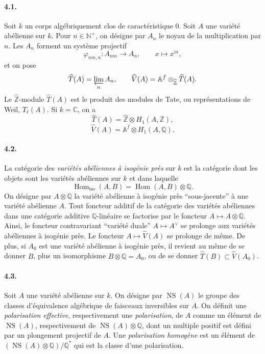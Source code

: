 \documentclass[10pt]{article}
\newcommand{\Af}{\mathbb A^f}
\newcommand{\C}{\mathbb C}
\newcommand{\Q}{\mathbb Q}
\newcommand{\Z}{\mathbb Z}
\newcommand{\Hom}{\operatorname{Hom}}
\newcommand{\NS}{\operatorname{NS}}
\begin{document}
\paragraph{4.1.} Soit $k$ un corps algébriquement clos de caractéristique $0$. Soit $A$ une variété abélienne sur $k$. Pour $n\in\mathbb N^+$, on désigne par $A_n$ le noyau de la multiplication par $n$. Les $A_n$ forment un système projectif
\[
\varphi_{nm,n}:A_{nm}\longrightarrow A_n,\qquad x\longmapsto x^m,
\]
et on pose
\[
\widehat T(A)=\varprojlim_n A_n,\qquad
\widehat V(A)=\Af\otimes_{\widehat{\Z}}\widehat T(A).
\]
Le $\widehat{\Z}$-module $\widehat T(A)$ est le produit des modules de Tate, ou représentations de Weil, $T_\ell(A)$. Si $k=\C$, on a
\[
\tag{4.1.1}
\widehat T(A)=\widehat{\Z}\otimes H_1(A,\Z),
\]
\[
\tag{4.1.2}
\widehat V(A)=\Af\otimes H_1(A,\Q).
\]

\paragraph{4.2.} La catégorie des \emph{variétés abéliennes à isogénie près} sur $k$ est la catégorie dont les objets sont les variétés abéliennes sur $k$ et dans laquelle
\[
\Hom_{\mathrm{iso}}(A,B)=\Hom(A,B)\otimes\Q.
\]
On désigne par $A\otimes\Q$ la variété abélienne à isogénie près ``sous-jacente'' à une variété abélienne $A$. Tout foncteur additif de la catégorie des variétés abéliennes dans une catégorie additive $\Q$-linéaire se factorise par le foncteur $A\mapsto A\otimes\Q$. Ainsi, le foncteur contravariant ``variété duale'' $A\mapsto A^\vee$ se prolonge aux variétés abéliennes à isogénie près. Le foncteur $A\mapsto\widehat V(A)$ se prolonge de même. De plus, si $A_0$ est une variété abélienne à isogénie près, il revient au même de se donner $B$, plus un isomorphisme $B\otimes\Q=A_0$, ou de se donner $\widehat T(B)\subset\widehat V(A_0)$.

\paragraph{4.3.} Soit $A$ une variété abélienne sur $k$. On désigne par $\NS(A)$ le groupe des classes d'équivalence algébrique de faisceaux inversibles sur $A$. On définit une \emph{polarisation effective}, respectivement une \emph{polarisation}, de $A$ comme un élément de $\NS(A)$, respectivement de $\NS(A)\otimes\Q$, dont un multiple positif est défini par un plongement projectif de $A$. Une \emph{polarisation homogène} est un élément de $(\NS(A)\otimes\Q)/\Q^*$ qui est la classe d'une polarisation.
\end{document}

